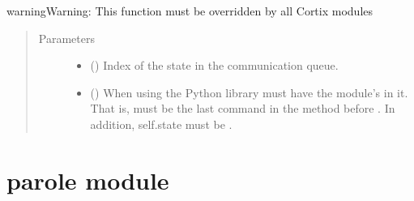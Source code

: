 \documentclass[letterpaper,10pt,openany,oneside,english]{sphinxmanual}
\begin{document}
\begin{fulllineitems}
\begin{fulllineitems}
\begin{sphinxadmonition}{warning}{Warning:}
This function must be overridden by all Cortix modules
\end{sphinxadmonition}
\begin{quote}\begin{description}
\item[{Parameters}] \leavevmode\begin{itemize}
\item {} 
\sphinxstyleliteralstrong{\sphinxupquote{{[}}}\sphinxstyleliteralstrong{\sphinxupquote{{]}}} () \textendash{} Index of the state in the communication queue.

\item {} 
\sphinxstyleliteralstrong{\sphinxupquote{{[}}}\sphinxstyleliteralstrong{\sphinxupquote{{]}}} () \textendash{} When using the Python  library  must have
the module’s  in it. That is,
 must be the last command in the
method before . In addition, self.state must be .

\end{itemize}

\end{description}\end{quote}

\end{fulllineitems}


\end{fulllineitems}



\section{parole module}
\label{\detokenize{examples_rst/parole:module-parole}}\label{\detokenize{examples_rst/parole:parole-module}}\label{\detokenize{examples_rst/parole::doc}}
\end{document}
